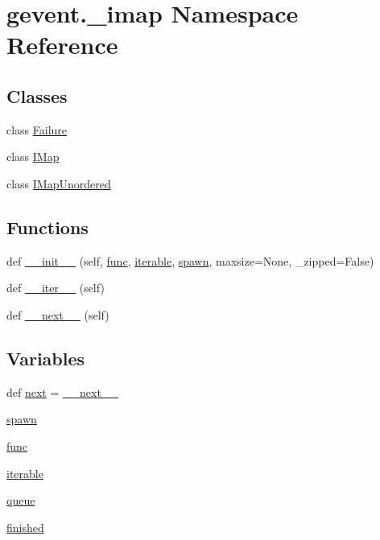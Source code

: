 \hypertarget{namespacegevent_1_1__imap}{}\section{gevent.\+\_\+imap Namespace Reference}
\label{namespacegevent_1_1__imap}
\subsection*{Classes}
\begin{DoxyCompactItemize}
\item 
class \hyperlink{classgevent_1_1__imap_1_1_failure}{Failure}
\item 
class \hyperlink{classgevent_1_1__imap_1_1_i_map}{I\+Map}
\item 
class \hyperlink{classgevent_1_1__imap_1_1_i_map_unordered}{I\+Map\+Unordered}
\end{DoxyCompactItemize}
\subsection*{Functions}
\begin{DoxyCompactItemize}
\item 
def \hyperlink{namespacegevent_1_1__imap_a23ed08242c1a42c9b63c3158b16ca39d}{\+\_\+\+\_\+init\+\_\+\+\_\+} (self, \hyperlink{namespacegevent_1_1__imap_a9a45f9a6a77a5a28042a1a9ffab1f2b8}{func}, \hyperlink{namespacegevent_1_1__imap_a81e72d61564a5c5b650434bd91ed11df}{iterable}, \hyperlink{namespacegevent_1_1__imap_a253b93eb8883154fa0bb9c2986251b7e}{spawn}, maxsize=None, \+\_\+zipped=False)
\item 
def \hyperlink{namespacegevent_1_1__imap_aa5389dec98803ddefb976f4bed762064}{\+\_\+\+\_\+iter\+\_\+\+\_\+} (self)
\item 
def \hyperlink{namespacegevent_1_1__imap_a11758ba47c470e87f6833e4f71e94186}{\+\_\+\+\_\+next\+\_\+\+\_\+} (self)
\end{DoxyCompactItemize}
\subsection*{Variables}
\begin{DoxyCompactItemize}
\item 
def \hyperlink{namespacegevent_1_1__imap_a4b3f8365f1f048be6e852755c0091b50}{next} = \hyperlink{namespacegevent_1_1__imap_a11758ba47c470e87f6833e4f71e94186}{\+\_\+\+\_\+next\+\_\+\+\_\+}
\item 
\hyperlink{namespacegevent_1_1__imap_a253b93eb8883154fa0bb9c2986251b7e}{spawn}
\item 
\hyperlink{namespacegevent_1_1__imap_a9a45f9a6a77a5a28042a1a9ffab1f2b8}{func}
\item 
\hyperlink{namespacegevent_1_1__imap_a81e72d61564a5c5b650434bd91ed11df}{iterable}
\item 
\hyperlink{namespacegevent_1_1__imap_a907dea8d9c9e5938226d0b103986e7e9}{queue}
\item 
\hyperlink{namespacegevent_1_1__imap_ab41540c06ef262540bb8225016a24fe1}{finished}
\end{DoxyCompactItemize}


